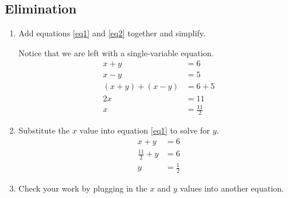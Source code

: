 \documentclass{article}
\begin{document}
    \subsection*{Elimination}
    \begin{enumerate}
        \item Add equations \eqref{eq1} and \eqref{eq2} together and simplify.
        
        Notice that we are left with a single-variable equation.
        \begin{align*}
            x + y &= 6 \nonumber \\
            x - y &= 5 \nonumber \\
            (x + y) + (x - y) &= 6 + 5 \\
            2x &= 11 \\
            x &= \frac{11}{2}
        \end{align*}
        \item Substitute the $x$ value into equation \eqref{eq1} to solve for $y$.
        \begin{align*}
            x + y &= 6 \\
            \frac{11}{2} + y &= 6 \\
            y &= \frac{1}{2}
        \end{align*}
        \item Check your work by plugging in the $x$ and $y$ values into another equation.
    \end{enumerate}
\end{document}

